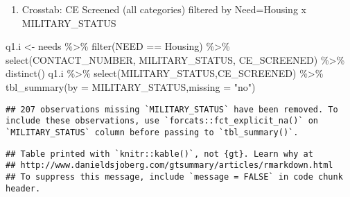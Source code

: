 \documentclass[
]{article}
\newenvironment{Shaded}{\begin{snugshade}}{\end{snugshade}}
\newcommand{\AttributeTok}[1]{\textcolor[rgb]{0.77,0.63,0.00}{#1}}
\newcommand{\FunctionTok}[1]{\textcolor[rgb]{0.00,0.00,0.00}{#1}}
\newcommand{\NormalTok}[1]{#1}
\newcommand{\OtherTok}[1]{\textcolor[rgb]{0.56,0.35,0.01}{#1}}
\newcommand{\SpecialCharTok}[1]{\textcolor[rgb]{0.00,0.00,0.00}{#1}}
\newcommand{\StringTok}[1]{\textcolor[rgb]{0.31,0.60,0.02}{#1}}
\providecommand{\tightlist}{%
  \setlength{\itemsep}{0pt}\setlength{\parskip}{0pt}}
\begin{document}
\begin{enumerate}
\def\labelenumi{\roman{enumi}.}
\tightlist
\item
  Crosstab: CE Screened (all categories) filtered by Need=Housing x
  MILITARY\_STATUS
\end{enumerate}

\begin{Shaded}
\begin{Highlighting}[]
\NormalTok{q1.i }\OtherTok{\textless{}{-}}\NormalTok{ needs }\SpecialCharTok{\%\textgreater{}\%} \FunctionTok{filter}\NormalTok{(NEED }\SpecialCharTok{==} \StringTok{\textquotesingle{}Housing\textquotesingle{}}\NormalTok{) }\SpecialCharTok{\%\textgreater{}\%} \FunctionTok{select}\NormalTok{(CONTACT\_NUMBER, MILITARY\_STATUS, CE\_SCREENED) }\SpecialCharTok{\%\textgreater{}\%} \FunctionTok{distinct}\NormalTok{()}
\NormalTok{q1.i }\SpecialCharTok{\%\textgreater{}\%} \FunctionTok{select}\NormalTok{(MILITARY\_STATUS,CE\_SCREENED) }\SpecialCharTok{\%\textgreater{}\%} \FunctionTok{tbl\_summary}\NormalTok{(}\AttributeTok{by =}\NormalTok{ MILITARY\_STATUS,}\AttributeTok{missing =} \StringTok{"no"}\NormalTok{)}
\end{Highlighting}
\end{Shaded}

\begin{verbatim}
## 207 observations missing `MILITARY_STATUS` have been removed. To include these observations, use `forcats::fct_explicit_na()` on `MILITARY_STATUS` column before passing to `tbl_summary()`.
\end{verbatim}

\begin{verbatim}
## Table printed with `knitr::kable()`, not {gt}. Learn why at
## http://www.danieldsjoberg.com/gtsummary/articles/rmarkdown.html
## To suppress this message, include `message = FALSE` in code chunk header.
\end{verbatim}
\end{document}
